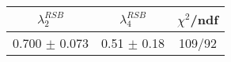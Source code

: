 \begin{tabular}{c|c||c}
$\lambda_{2}^{RSB}$ & $\lambda_4^{RSB}$ & $\chi^{2}$/ndf \\
\hline
0.700 $\pm$ 0.073 & 0.51 $\pm$ 0.18 & 109/92\\
\end{tabular}
